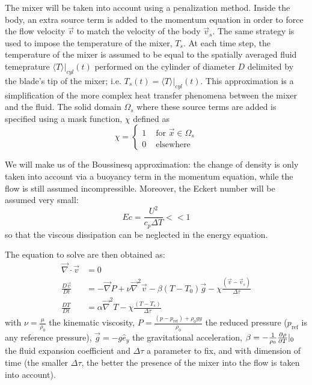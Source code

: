 \documentclass[a4paper,10pt]{scrartcl}
\newcommand\partiald[3]{\frac{\partial\ifnum#1>1 ^{#1}\fi #2}{\partial #3\ifnum#1>1 ^{#1}\fi}}
\newcommand\matder[1]{\frac{D#1}{Dt}}
\renewcommand\div{\vec{\nabla}\cdot}
\newcommand\lapl{\vec{\nabla}^2}
\newcommand\grad{\vec{\nabla}}
\begin{document}
The mixer will be taken into account using a penalization method. Inside the body, an extra source term is added to the momentum equation in order to force the flow velocity $\vec{v}$ to match the velocity of the body $\vec{v}_s$. The same strategy is used to impose the temperature of the mixer, $T_s$. At each time step, the temperature of the mixer is assumed to be equal to the spatially averaged fluid temeprature $\langle T\rangle\rvert_{cyl}(t)$ performed on the cylinder of diameter $D$ delimited by the blade's tip of the mixer; i.e. $T_s(t) = \langle T\rangle\rvert_{cyl}(t)$. This approximation is a simplification of the more complex heat transfer phenomena between the mixer and the fluid. The solid domain $\Omega_s$ where these source terms are added is specified using a mask function, $\chi$ defined as
\begin{equation} \chi = \left\{ \begin{aligned} 1 & \text{ for } \vec{x}\in\Omega_s \\ 0 & \text{ elsewhere}\end{aligned}\right. \end{equation}

We will make us of the Boussinesq approximation: the change of density is only taken into account via a buoyancy term in the momentum equation, while the flow is still assumed incompressible. Moreover, the Eckert number will be assumed very small:
\begin{equation} Ec = \frac{U^2}{c_p\Delta T} << 1 \end{equation}
so that the viscous dissipation can be neglected in the energy equation.

The equation to solve are then obtained as:
\begin{align}
        \div\vec{v} &= 0 \label{eq:tosolve1}\\
        \matder{\vec{v}} &= -\grad P + \nu\lapl\vec{v} - \beta(T-T_0)\vec{g} - \chi\frac{(\vec{v}-\vec{v}_s)}{\Delta \tau} \label{eq:tosolve2}\\
        \matder{T} &= \alpha\lapl T - \chi\frac{(T-T_s)}{\Delta \tau} \label{eq:tosolve3}
\end{align}
with $\nu = \frac{\mu}{\rho_0}$ the kinematic viscosity, $P=\frac{(p-p_\mathrm{ref})+\rho_0gy}{\rho_0}$ the reduced pressure ($p_\mathrm{ref}$ is any reference pressure), $\vec{g} = -g\hat{e}_y$ the gravitational acceleration, $\beta = -\frac{1}{\rho_0}\partiald{1}{\rho}{T}\rvert_0$ the fluid expansion coefficient and $\Delta\tau$ a parameter to fix, and with dimension of time (the smaller $\Delta\tau$, the better the presence of the mixer into the flow is taken into account).
\end{document}
